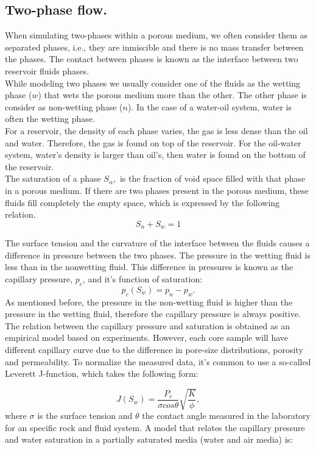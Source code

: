 \documentclass[a4paper,10pt]{report}
\begin{document}
\subsection{Two-phase flow.}
When simulating two-phases within a porous medium, we often consider them as separated phases, i.e.,
they are inmiscible and there is no mass transfer between the phases. 
The contact between phases is known as the interface between two reservoir fluids phases.\\ 
While modeling two phases we 
usually consider one of the fluids as the wetting phase ($w$) that wets the porous medium more than the other.
The other phase is consider as non-wetting phase ($n$). In the case of a water-oil system, water is often 
the wetting phase. \\
For a reservoir, the density of each phase varies, the gas is less dense than the oil and water. 
Therefore, the gas is found on top of the reservoir. For the oil-water system, water's density is larger 
than oil's, then water is found on the bottom of the reservoir.\\
The saturation of a phase $S_{\alpha},$ is the fraction of void space filled with that phase in a porous 
medium.
If there are two phases present in the porous medium, these fluids fill completely the empty space, which is
expressed by the following relation.
\begin{equation}\label{eq:satrel}
 S_n+S_w=1
\end{equation}

The surface tension and the curvature of the interface between the fluids causes a difference in pressure
between the two phases. 
The pressure in the wetting fluid is less than in the nonwetting fluid. 
This difference in pressures is known as the capillary pressure, $p_c$, and it's function of saturation:
\begin{equation}\label{eq:cappress}
 p_c(S_w)=p_n-p_w.
\end{equation}
As mentioned before, the pressure in the non-wetting fluid is higher than the pressure in the wetting fluid, therefore the 
capillary pressure is always positive. 
The relation between the capillary pressure and saturation is obtained as an empirical model based on experiments. 
However, each core sample will have different capillary curve due to the difference in pore-size distributions,
porosity and permeability.
To normalize the measured data, it's common to use a so-called Leverett J-function, which takes the following form:

\begin{equation}
 J(S_w)=\frac{P_c}{\sigma cos \theta}\sqrt{\frac{K}{\phi}},
\end{equation}
where $\sigma$ is the surface tension and $\theta$ the contact angle measured in the laboratory for an specific rock and fluid system.
A model that relates the capillary pressure and water saturation in a partially saturated media (water and air media) is:
\end{document}
